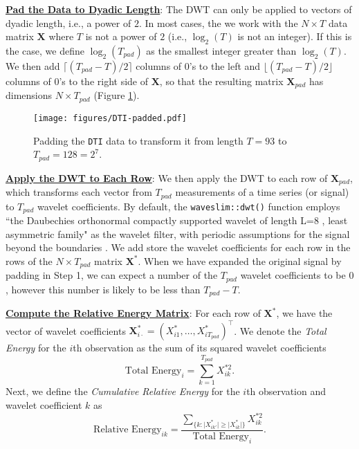 \begin{steps}
  \item \underline{\textbf{Pad the Data to Dyadic Length}}: The DWT can only be applied to vectors of dyadic length, i.e., a power of $2$. In most cases, the we work with the $N \times T$ data matrix $\mathbf{X}$ where $T$ is not a power of $2$ (i.e., $\log_2(T)$ is not an integer). If this is the case, we define $\log_2(T_{pad})$ as the smallest integer greater than $\log_2(T)$. We then add $\lceil (T_{pad} - T)/2 \rceil$ columns of $0$'s to the left and $\lfloor (T_{pad} - T)/2 \rfloor$ columns of $0$'s to the right side of $\mathbf{X}$, so that the resulting matrix $\mathbf{X}_{pad}$ has dimensions $N \times T_{pad}$ (Figure \ref{fig:DTI-padded}).
  \begin{figure}[H]
      \centering
      \texttt{[image: figures/DTI-padded.pdf]}
      \caption{Padding the \texttt{DTI} data to transform it from length $T = 93$ to $T_{pad} = 128 = 2^7$.}
      \label{fig:DTI-padded}
  \end{figure}
  \item \underline{\textbf{Apply the DWT to Each Row}}: We then apply the DWT to each row of $\mathbf{X}_{pad}$, which transforms each vector from $T_{pad}$ measurements of a time series (or signal) to $T_{pad}$ wavelet coefficients.
  By default, the \texttt{waveslim::dwt()} function employs ``the Daubechies orthonormal compactly supported wavelet of length L=8 \parencite{daubechies_ten_1992}, least asymmetric family" as the wavelet filter, with periodic assumptions for the signal beyond the boundaries \parencite[][p.7]{whitcher_waveslim_2024}.
  We add store the wavelet coefficients for each row in the rows of the $N \times T_{pad}$ matrix $\mathbf{X}^*$.
  When we have expanded the original signal by padding in Step 1, we can expect a number of the $T_{pad}$ wavelet coefficients to be $0$, however this number is likely to be less than $T_{pad} - T$.
  \item \underline{\textbf{Compute the Relative Energy Matrix}}: For each row of $\mathbf{X}^*$, we have the vector of wavelet coefficients $\mathbf{X}^*_{i\cdot} = (X^*_{i1}, \dots,X^*_{iT_{pad}})^\top$. We denote the \emph{Total Energy} for the $i$th observation as the sum of its squared wavelet coefficients
  $$\text{Total Energy}_i = \sum_{k=1}^{T_{pad}}X^{*2}_{ik}.$$ Next, we define the \emph{Cumulative Relative Energy} for the $i$th observation and wavelet coefficient $k$ as 
  $$
  \text{Relative Energy}_{ik} = \frac{\sum_{\{k: \lvert X^*_{ik'}\rvert  \geq \lvert X^*_{ik}\rvert \}}X^{*2}_{ik}}{\text{Total Energy}_i}.
$$
\end{steps}
